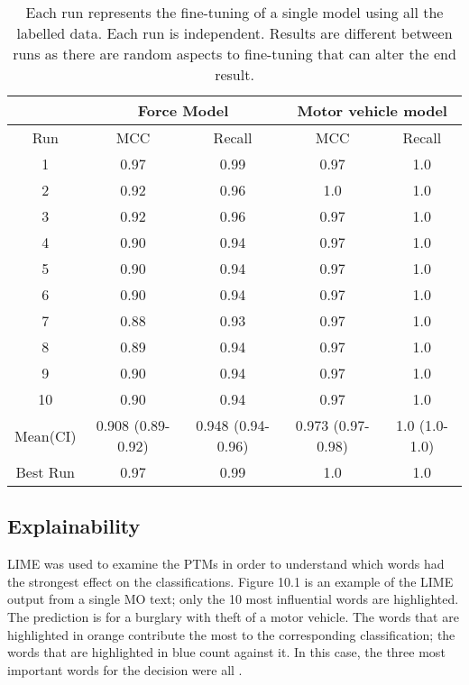 \begin{table}[]
\begin{tabular}{@{}ccccc@{}}
\toprule
\multicolumn{1}{l}{} & \multicolumn{2}{c}{Force Model}       & \multicolumn{2}{c}{Motor vehicle model} \\\midrule
Run                  & MCC               & Recall            & MCC                & Recall   \\\midrule
1                    & 0.97              & 0.99              & 0.97               & 1.0        \\
2                    & 0.92              & 0.96              & 1.0                  & 1.0        \\
3                    & 0.92              & 0.96              & 0.97               & 1.0        \\
4                    & 0.90               & 0.94              & 0.97               & 1.0        \\
5                    & 0.90               & 0.94              & 0.97               & 1.0        \\
6                    & 0.90               & 0.94              & 0.97               & 1.0        \\
7                    & 0.88              & 0.93              & 0.97               & 1.0        \\
8                    & 0.89              & 0.94              & 0.97               & 1.0        \\
9                    & 0.90               & 0.94              & 0.97               & 1.0        \\
10                   & 0.90               & 0.94              & 0.97               & 1.0        \\\midrule
Mean(CI)             & 0.908 (0.89-0.92) & 0.948 (0.94-0.96) & 0.973 (0.97-0.98)  & 1.0 (1.0-1.0)  \\\midrule
Best Run             & 0.97              & 0.99              & 1.0                  & 1.0        \\ \bottomrule
\end{tabular}
\caption[Model metrics. PF1 data. Force used and motor vehicle stolen models]{\label{tab:final-model} Each run represents the fine-tuning of a single model using all the labelled data. Each run is independent. Results are different between runs as there are random aspects to fine-tuning that can alter the end result. }
\end{table}

\subsection{Explainability} LIME was used to examine the PTMs in order to understand which words had the strongest effect on the classifications. Figure 10.1 is an example of the LIME output from a single MO text; only the 10 most influential words are highlighted.  The prediction is for a burglary with theft of a motor vehicle. The words that are highlighted in orange contribute the most to the corresponding classification; the words that are highlighted in blue count against it. In this case, the three most important words for the decision were all . 

